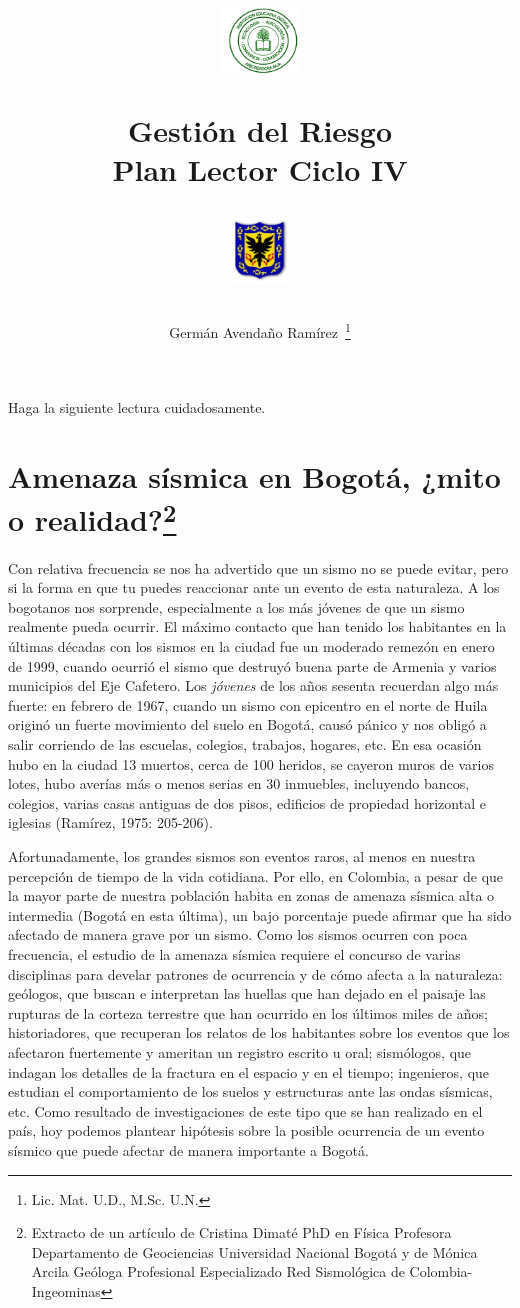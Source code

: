 \documentclass[10pt,twoside]{article}
\author{Germ\'an Avenda\~no Ram\'irez~\thanks{Lic. Mat. U.D., M.Sc. U.N.}}
\title{\begin{minipage}{.2\textwidth}
\includegraphics[height=1.75cm]{Images/logo-colegio.png}\end{minipage}
\begin{minipage}{.55\textwidth}
\begin{center}
Gestión del Riesgo\\
Plan Lector Ciclo IV
\end{center}
\end{minipage}\hfill
\begin{minipage}{.2\textwidth}
\includegraphics[height=1.75cm]{Images/logo-sed.png} 
\end{minipage}}
\date{}
\begin{document}
\maketitle
\begin{multicols}{2}
Haga la siguiente lectura cuidadosamente.
\section*{Amenaza sísmica en Bogotá, ¿mito o realidad?\footnote{Extracto de un artículo de Cristina Dimaté
PhD en Física Profesora Departamento de Geociencias Universidad Nacional Bogotá y de Mónica Arcila Geóloga Profesional Especializado Red Sismológica de Colombia-Ingeominas}}
Con relativa frecuencia se nos ha advertido que un sismo no se puede evitar, pero si la forma en que tu puedes reaccionar ante un evento de esta naturaleza. A los bogotanos nos sorprende, especialmente a los más jóvenes de que un sismo realmente pueda ocurrir. El máximo contacto que han tenido los habitantes en la últimas décadas con los sismos en la ciudad fue un moderado remezón en enero de 1999, cuando ocurrió el sismo que destruyó buena parte de Armenia y varios municipios del Eje Cafetero. Los \emph{jóvenes} de los años sesenta recuerdan algo más fuerte: en febrero de 1967, cuando un sismo con epicentro en el norte de Huila originó un fuerte movimiento del suelo en Bogotá, causó pánico y nos obligó a salir corriendo de las escuelas, colegios, trabajos, hogares, etc. En esa ocasión hubo en la ciudad 13 muertos, cerca de 100 heridos, se cayeron muros de varios lotes, hubo averías más o menos serias en 30 inmuebles, incluyendo bancos, colegios, varias casas antiguas de dos pisos, edificios de propiedad horizontal e iglesias (Ramírez, 1975: 205-206).

Afortunadamente, los grandes sismos son eventos raros, al menos
en nuestra percepción de tiempo de la vida cotidiana. Por ello, en Colombia, a pesar de que la mayor parte de nuestra población habita en zonas de amenaza sísmica alta o intermedia (Bogotá en
esta última), un bajo porcentaje puede afirmar que ha sido afectado de manera grave por un sismo. Como los sismos ocurren con poca frecuencia, el estudio de la amenaza sísmica requiere el concurso de varias disciplinas para develar patrones de ocurrencia y de cómo afecta a la naturaleza: geólogos, que buscan e interpretan las huellas que han dejado en el paisaje las rupturas de la corteza terrestre que han ocurrido en los últimos miles de años; historiadores, que recuperan los relatos de los habitantes
sobre los eventos que los afectaron fuertemente y ameritan un registro escrito u oral; sismólogos, que indagan los detalles de la fractura en el espacio y en el tiempo; ingenieros, que estudian el comportamiento de los suelos y estructuras ante las ondas sísmicas, etc. Como resultado de investigaciones de este tipo que se han realizado en el país, hoy podemos plantear hipótesis
sobre la posible ocurrencia de un evento sísmico que puede afectar de manera importante a Bogotá.

\end{multicols}
\end{document}
